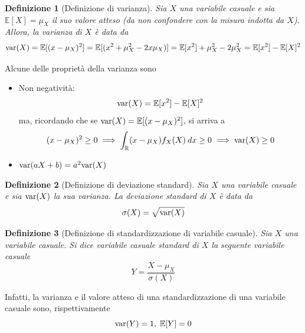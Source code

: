 \documentclass{article}
\newtheorem{definition}{Definizione}
\begin{document}
            \begin{definition}[Definizione di varianza]
                Sia $X$ una variabile casuale e sia $\mathbb{E}[X] = \mu_{X}$ il suo valore atteso (da non confondere con la misura indotta da $X$).
                Allora, la varianza di $X$ è data da
                \[
                    \textnormal{var}(X) = \mathbb{E}[(x - \mu_{X})^{2}] = \mathbb{E}[(x^{2} + \mu_{X}^{2} - 2 x \mu_{X})] = \mathbb{E}[x^{2}] + \mu_{X}^{2} - 2 \mu_{X}^{2} = \mathbb{E}[x^{2}] - \mathbb{E}[X]^{2}
                \]
            \end{definition}

            Alcune delle proprietà della varianza sono
            \begin{itemize}
                \item Non negatività: 
                \[
                    \textnormal{var}(X) = \mathbb{E}[x^{2}] - \mathbb{E}[X]^{2} 
                \]
                ma, ricordando che se $\textnormal{var}(X) = \mathbb{E}[(x - \mu_{X})^{2}]$, si arriva a
                \[
                    (x - \mu_{X})^{2} \geq 0 \implies \int_{\mathbb{R}} (x - \mu_{X}) f_{X}(X) \: dx \geq 0 \implies \textnormal{var}(X) \geq 0
                \]
                \item $\textnormal{var}(aX + b) = a^{2} \textnormal{var}(X)$
            \end{itemize}

            \begin{definition}[Definizione di deviazione standard]
                Sia $X$ una variabile casuale e sia $\textnormal{var}(X)$ la sua varianza.
                La deviazione standard di $X$ è data da
                \[
                    \sigma(X) = \sqrt{\textnormal{var}(X)}
                \]
            \end{definition}

            \begin{definition}[Definizione di standardizzazione di variabile casuale]
                Sia $X$ una variabile casuale.
                Si dice variabile casuale standard di $X$ la seguente variabile casuale
                \[
                    Y = \frac{X - \mu_{X}}{\sigma(X)}
                \]
            \end{definition}

            Infatti, la varianza e il valore atteso di una standardizzazione di una variabile casuale sono, rispettivamente
            \[
                \textnormal{var}(Y) = 1, \; \mathbb{E}[Y] = 0
            \]
\end{document}
